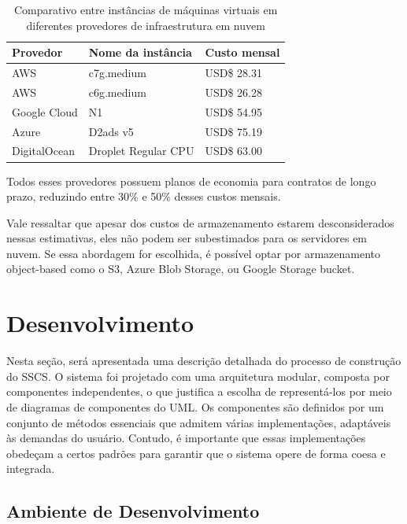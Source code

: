 \documentclass[12pt, %
openright, 
oneside, %
a4paper,    %
brazil]{facom-ufu-abntex2}
\begin{document}
\begin{table}[ht]
	\centering
	\caption{Comparativo entre instâncias de máquinas virtuais em
		diferentes provedores de infraestrutura em nuvem}
	\label{tab:estima}
	\begin{tabular}{|l|l|l|}
		\hline
		Provedor     & Nome da instância   & Custo mensal
		\\ \hline
		AWS          & c7g.medium          & USD\$ 28.31
		\\ \hline
		AWS          & c6g.medium          & USD\$ 26.28
		\\ \hline
		Google Cloud & N1                  & USD\$ 54.95
		\\ \hline
		Azure        & D2ads v5            & USD\$ 75.19
		\\ \hline
		DigitalOcean & Droplet Regular CPU & USD\$ 63.00
		\\ \hline
	\end{tabular}
\end{table}

Todos esses provedores possuem planos de economia para contratos de longo
prazo, reduzindo entre 30\% e 50\% desses custos mensais.

Vale ressaltar que apesar dos custos de armazenamento estarem desconsiderados
nessas estimativas, eles não podem ser subestimados para os servidores em
nuvem. Se essa abordagem for escolhida, é possível optar por armazenamento
object-based como o S3, Azure Blob Storage, ou Google Storage bucket.

\chapter{Desenvolvimento}

Nesta seção, será apresentada uma descrição detalhada do processo de construção
do SSCS. O sistema foi projetado com uma arquitetura modular, composta por
componentes independentes, o que justifica a escolha de representá-los por meio
de diagramas de componentes do UML. Os componentes são definidos por um
conjunto de métodos essenciais que admitem várias implementações, adaptáveis às
demandas do usuário. Contudo, é importante que essas implementações obedeçam a
certos padrões para garantir que o sistema opere de forma coesa e integrada.

\section{Ambiente de Desenvolvimento}
\end{document}
